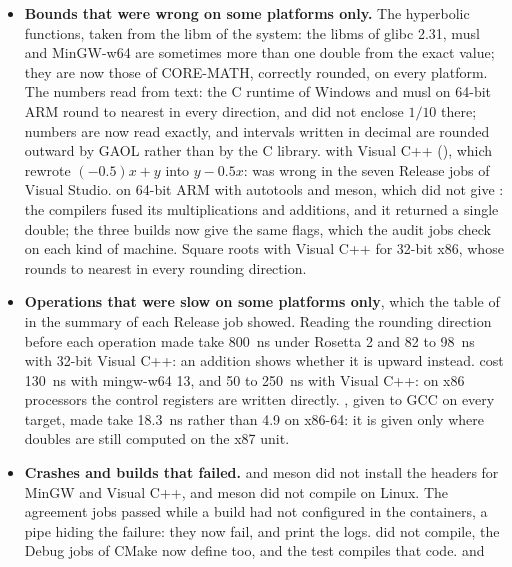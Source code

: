 \begin{itemize}
\item[$\bullet$] \textbf{Bounds that were wrong on some platforms only.}
  The hyperbolic functions, taken from the libm of the system: the libms of
  glibc 2.31, musl and MinGW-w64 are sometimes more than one double from the
  exact value; they are now those of CORE-MATH, correctly rounded, on every
  platform.\newinvfive{} The numbers read from text: the C runtime of
  Windows and musl on 64-bit ARM round  to nearest in every
  direction, and  did not enclose $1/10$ there;
  numbers are now read exactly, and intervals written in decimal are
  rounded outward by GAOL rather than by the C library.\newinvfive{}
   with Visual C++ (), which rewrote
  $(-0.5)x+y$ into $y-0.5x$:  was wrong in the
  seven Release jobs of Visual Studio.  on 64-bit ARM with
  autotools and meson, which did not give : the
  compilers fused its multiplications and additions, and it returned a
  single double; the three builds now give the same flags, which the audit
  jobs check on each kind of machine. Square roots with Visual C++ for
  32-bit x86, whose  rounds to nearest in every rounding
  direction.
\item[$\bullet$] \textbf{Operations that were slow on some platforms only},
  which the table of  in the summary of each
  Release job showed. Reading the rounding direction before each operation
  made  take 800~ns under Rosetta 2 and 82 to 98~ns with 32-bit
  Visual C++: an addition shows whether it is upward instead.
   cost 130~ns with mingw-w64 13, and 50 to 250~ns with
  Visual C++: on x86 processors the control registers are written directly.
  , given to GCC on every target, made 
  take 18.3~ns rather than 4.9 on x86-64: it is given only where doubles are
  still computed on the x87 unit.
\item[$\bullet$] \textbf{Crashes and builds that failed.} 
  and meson did not install the headers for MinGW and Visual C++, and meson
  did not compile on Linux. The agreement jobs passed while a build had not
  configured in the containers, a pipe hiding the failure: they now fail,
  and print the logs.  did not compile, the
  Debug jobs of CMake now define  too, and the test
   compiles that code.  and 

\end{itemize}
